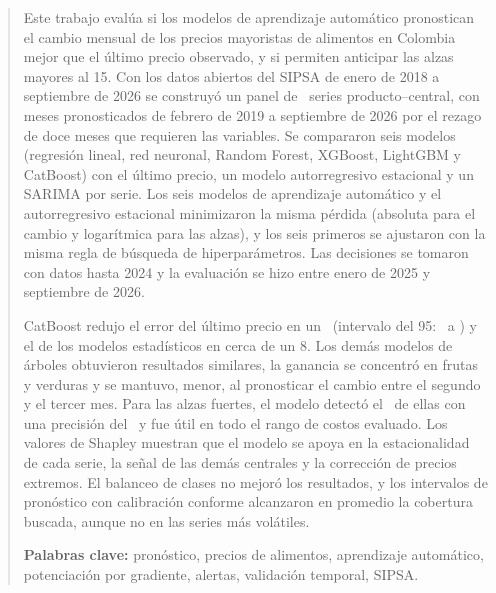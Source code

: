 \renewcommand\abstractname{Resumen}
\begin{abstract}
\addchaptertocentry{\abstractname}

Este trabajo evalúa si los modelos de aprendizaje automático pronostican el cambio mensual de los precios mayoristas de alimentos en Colombia mejor que el último precio observado, y si permiten anticipar las alzas mayores al 15\pct. Con los datos abiertos del SIPSA de enero de 2018 a septiembre de 2026 se construyó un panel de \cseries\ series producto--central, con meses pronosticados de febrero de 2019 a septiembre de 2026 por el rezago de doce meses que requieren las variables. Se compararon seis modelos (regresión lineal, red neuronal, Random Forest, XGBoost, LightGBM y CatBoost) con el último precio, un modelo autorregresivo estacional y un SARIMA por serie. Los seis modelos de aprendizaje automático y el autorregresivo estacional minimizaron la misma pérdida (absoluta para el cambio y logarítmica para las alzas), y los seis primeros se ajustaron con la misma regla de búsqueda de hiperparámetros. Las decisiones se tomaron con datos hasta 2024 y la evaluación se hizo entre enero de 2025 y septiembre de 2026.

CatBoost redujo el error del último precio en un \cmeje\pct\ (intervalo del 95\pct: \cmejloe\ a \cmejhie) y el de los modelos estadísticos en cerca de un 8\pct. Los demás modelos de árboles obtuvieron resultados similares, la ganancia se concentró en frutas y verduras y se mantuvo, menor, al pronosticar el cambio entre el segundo y el tercer mes. Para las alzas fuertes, el modelo detectó el \crece\pct\ de ellas con una precisión del \cprece\pct\ y fue útil en todo el rango de costos evaluado. Los valores de Shapley muestran que el modelo se apoya en la estacionalidad de cada serie, la señal de las demás centrales y la corrección de precios extremos. El balanceo de clases no mejoró los resultados, y los intervalos de pronóstico con calibración conforme alcanzaron en promedio la cobertura buscada, aunque no en las series más volátiles.

\medskip

\textbf{Palabras clave:} pronóstico, precios de alimentos, aprendizaje automático, potenciación por gradiente, alertas, validación temporal, SIPSA.
\end{abstract}


